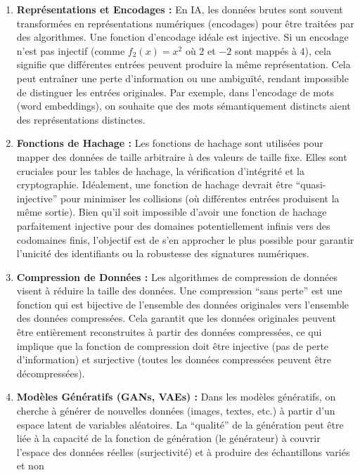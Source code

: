 \documentclass[12pt,a4paper]{report}
\begin{document}
\begin{enumerate}
\def\labelenumi{\arabic{enumi}.}
\item
  \textbf{Représentations et Encodages :} En IA, les données brutes sont
  souvent transformées en représentations numériques (encodages) pour
  être traitées par des algorithmes. Une fonction d'encodage idéale est
  injective. Si un encodage n'est pas injectif (comme \(f_2(x)=x^2\) où
  \(2\) et \(-2\) sont mappés à \(4\)), cela signifie que différentes
  entrées peuvent produire la même représentation. Cela peut entraîner
  une perte d'information ou une ambiguïté, rendant impossible de
  distinguer les entrées originales. Par exemple, dans l'encodage de
  mots (word embeddings), on souhaite que des mots sémantiquement
  distincts aient des représentations distinctes.
\item
  \textbf{Fonctions de Hachage :} Les fonctions de hachage sont
  utilisées pour mapper des données de taille arbitraire à des valeurs
  de taille fixe. Elles sont cruciales pour les tables de hachage, la
  vérification d'intégrité et la cryptographie. Idéalement, une fonction
  de hachage devrait être ``quasi-injective'' pour minimiser les
  collisions (où différentes entrées produisent la même sortie). Bien
  qu'il soit impossible d'avoir une fonction de hachage parfaitement
  injective pour des domaines potentiellement infinis vers des
  codomaines finis, l'objectif est de s'en approcher le plus possible
  pour garantir l'unicité des identifiants ou la robustesse des
  signatures numériques.
\item
  \textbf{Compression de Données :} Les algorithmes de compression de
  données visent à réduire la taille des données. Une compression ``sans
  perte'' est une fonction qui est bijective de l'ensemble des données
  originales vers l'ensemble des données compressées. Cela garantit que
  les données originales peuvent être entièrement reconstruites à partir
  des données compressées, ce qui implique que la fonction de
  compression doit être injective (pas de perte d'information) et
  surjective (toutes les données compressées peuvent être
  décompressées).
\item
  \textbf{Modèles Génératifs (GANs, VAEs) :} Dans les modèles
  génératifs, on cherche à générer de nouvelles données (images, textes,
  etc.) à partir d'un espace latent de variables aléatoires. La
  ``qualité'' de la génération peut être liée à la capacité de la
  fonction de génération (le générateur) à couvrir l'espace des données
  réelles (surjectivité) et à produire des échantillons variés et non

\end{enumerate}
\end{document}
